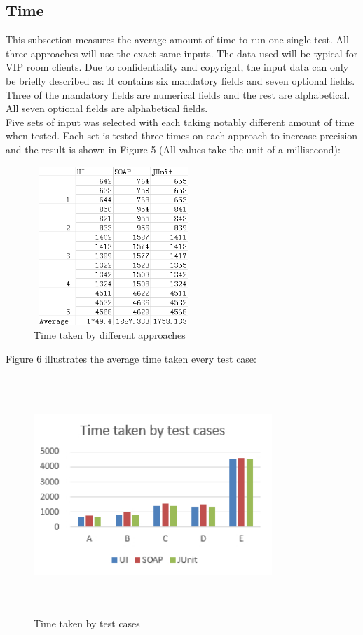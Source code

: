 \documentclass[12pt]{article}
\begin{document}
\subsection{Time}
This subsection measures the average amount of time to run one single test. All three approaches will use the exact same inputs. The data used will be typical for VIP room clients. Due to confidentiality and copyright, the input data can only be briefly described as:  It contains six mandatory fields and seven optional fields. Three of the mandatory fields are numerical fields and the rest are alphabetical. All seven optional fields are alphabetical fields.\\

Five sets of input was selected with each taking notably different amount of time when tested. Each set is tested three times on each approach to increase precision and the result is shown in Figure 5 (All values take the unit of a millisecond):\\


\begin{figure}[ht!]
\centering
\includegraphics[width=6cm,height=6cm,keepaspectratio]{img/timeTable.jpg}
\caption{Time taken by different approaches}
\label{overflow}
\end{figure}


Figure 6 illustrates the average time taken every test case:\\

\begin{figure}[ht!]
\centering
\includegraphics[width=9cm,height=9cm,keepaspectratio]{img/timeGraph.jpg}
\caption{Time taken by test cases}
\label{overflow}
\end{figure}
\end{document}
